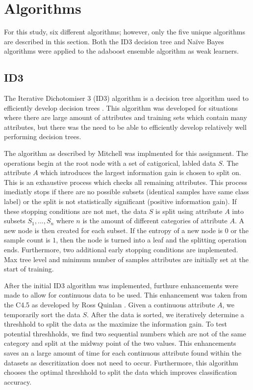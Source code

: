 \documentclass[11pt]{article}
\begin{document}
\section{Algorithms}
For this study, six different algorithms; however, only the five unique algorithms are described in this section. Both the ID3 decision tree and Naïve Bayes algorithms were applied to the adaboost ensemble algorithm as weak learners.

\subsection{ID3}
The Iterative Dichotomiser 3 (ID3) algorithm is a decision tree algorithm used to efficiently develop decision trees \cite{Quinlan:1986:IDT:637962.637969}. This algorithm was developed for situations where there are large amount of attributes and training sets which contain many attributes, but there was the need to be able to efficiently develop relatively well performing decision trees.

The algorithm as described by Mitchell \cite{Mitchell:1997:ML:541177} was implmented for this assignment. The operations begin at the root node with a set of catigorical, labled data $S$. The attribute $A$ which introduces the largest information gain is chosen to split on. This is an exhaustive process which checks all remaining attributes. This process imediatly stops if there are no possible subsets (identical samples have same class label) or the split is not statistically significant (positive information gain). If these stopping conditions are not met, the data $S$ is split using attribute $A$ into subsets ${S_1,...,S_n}$ where $n$ is the amount of different categories of attribute $A$. A new node is then created for each subset. If the entropy of a new node is $0$ or the sample count is $1$, then the node is turned into a leaf and the splitting operation ends. Furthermore, two additional early stopping conditions are implemented. Max tree level and minimum number of samples attributes are initially set at the start of training.

After the initial ID3 algorithm was implemented, furthure enhancements were made to allow for continuous data to be used. This enhancement was taken from the C4.5  as developed by Ross Quinlan \citep{c45algorithm}. Given a continuous attribute $A$, we temporarily sort the data $S$. After the data is sorted, we iteratively determine a threshhold to split the data as the maximize the information gain. To test potential threshholds, we find two sequential numbers which are not of the same category and split at the midway point of the two values. This enhancements saves an a large amount of time for each continuous attribute found within the datasets as descritization does not need to occur. Furthermore, this algorithm chooses the optimal threshhold to split the data which improves classification accuracy.
\end{document}
